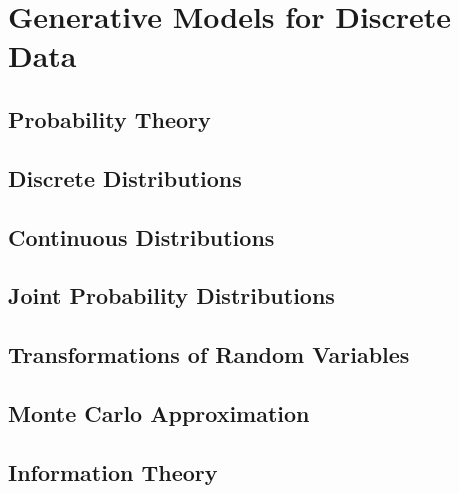 \chapter{Generative Models for Discrete Data}
\section{Probability Theory}
\section{Discrete Distributions}
\section{Continuous Distributions}
\section{Joint Probability Distributions}
\section{Transformations of Random Variables}
\section{Monte Carlo Approximation}
\section{Information Theory}
